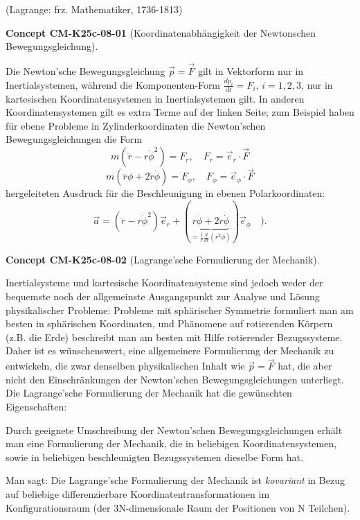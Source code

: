 \documentclass[10pt, letterpaper]{article}
\newcommand{\CustomHeading}[3]{%
  \par\medskip\noindent%
  \textbf{#1 #2} \textnormal{(#3)}.\enskip%
}
\newenvironment{CONC}[2]{\begin{unitbox}\CustomHeading{Concept}{#1}{#2}}{\end{unitbox}}
\begin{document}
\vspace{0.3cm}
\noindent (Lagrange: frz. Mathematiker, 1736-1813)

\begin{CONC}{CM-K25c-08-01}{Koordinatenabhängigkeit der Newtonschen Bewegungsgleichung}
Die Newton'sche Bewegungsgleichung $\vec{p} = \vec{F}$ gilt in Vektorform nur in Inertialsystemen, während die Komponenten-Form $\frac{dp_i}{dt} = F_i$, $i=1,2,3$, nur in kartesischen Koordinatensystemen in Inertialsystemen gilt. In anderen Koordinatensystemen gilt es extra Terme auf der linken Seite; zum Beispiel haben für ebene Probleme in Zylinderkoordinaten die Newton'schen Bewegungsgleichungen die Form
\[m(\ddot{r}-r\dot{\phi}^2) = F_r, \quad F_r = \vec{e}_r \cdot \vec{F}\]
\[m(\ddot{r}\phi + 2\dot{r}\dot{\phi}) = F_{\phi}, \quad F_{\phi} = \vec{e}_{\phi} \cdot \vec{F}\]
hergeleiteten Ausdruck für die Beschleunigung in ebenen Polarkoordinaten:
\[\vec{a} = (\ddot{r}-r\dot{\phi}^2)\vec{e}_r + (\underbrace{r\ddot{\phi} + 2\dot{r}\dot{\phi}}_{=\frac{1}{r}\frac{d}{dt}(r^2\dot{\phi})})\vec{e}_{\phi} \quad).\]
\end{CONC}

\begin{CONC}{CM-K25c-08-02}{Lagrange'sche Formulierung der Mechanik}
Inertialsysteme und kartesische Koordinatensysteme sind jedoch weder der bequemste noch der allgemeinste Ausgangspunkt zur Analyse und Lösung physikalischer Probleme: Probleme mit sphärischer Symmetrie formuliert man am besten in sphärischen Koordinaten, und Phänomene auf rotierenden Körpern (z.B. die Erde) beschreibt man am besten mit Hilfe rotierender Bezugssysteme. Daher ist es wünschenswert, eine allgemeinere Formulierung der Mechanik zu entwickeln, die zwar denselben physikalischen Inhalt wie $\vec{p}=\vec{F}$ hat, die aber nicht den Einschränkungen der Newton'schen Bewegungsgleichungen unterliegt. Die Lagrange'sche Formulierung der Mechanik hat die gewünschten Eigenschaften:

Durch geeignete Umschreibung der Newton'schen Bewegungsgleichungen erhält man eine Formulierung der Mechanik, die in beliebigen Koordinatensystemen, sowie in beliebigen beschleunigten Bezugssystemen dieselbe Form hat.

Man sagt: Die Lagrange'sche Formulierung der Mechanik ist \emph{kovariant} in Bezug auf beliebige differenzierbare Koordinatentransformationen im Konfigurationsraum (der 3N-dimensionale Raum der Positionen von N Teilchen).
\end{CONC}
\end{document}
